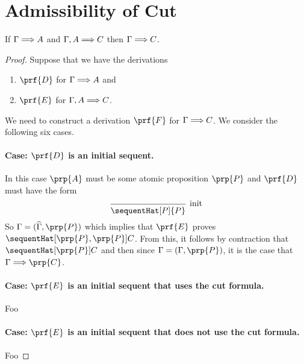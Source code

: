 


\maketitle

\section{Admissibility of Cut}

\begin{theorem}[Cut]
  If $\sequent{A}$ and $\sequent[A]{C}$ then $\sequent{C}$.
\end{theorem}
\begin{proof}
  Suppose that we have the derivations
  \begin{enumerate}
    \item $\prf{D}$ for $\sequent{A}$ and
    \item $\prf{E}$ for $\sequent[A]{C}$.
  \end{enumerate}
  We need to construct a derivation $\prf{F}$ for $\sequent{}{C}$.
  We consider the following six cases.

  \paragraph{Case: $\prf{D}$ is an initial sequent.} In this case
  $\prp{A}$ must be some atomic proposition $\prp{P}$ and $\prf{D}$
  must have the form
  \[
      \begin{prooftree}
        \infer0[init]{\sequentHat[P]{P}}
      \end{prooftree}
  \]
  So $\Gamma = (\widehat{\Gamma}, \prp{P})$ which implies that $\prf{E}$ proves
  $\sequentHat[\prp{P}, \prp{P}]{C}$. From this, it follows by contraction
  that $\sequentHat[\prp{P}]{C}$ and then since $\Gamma = (\Gamma, \prp{P})$,
  it is the case that $\sequent{\prp{C}}$.

  \paragraph{Case: $\prf{E}$ is an initial sequent that uses the cut formula.}
  Foo

  \paragraph{Case: $\prf{E}$ is an initial sequent that does not use the cut
  formula.} Foo


\end{proof}

